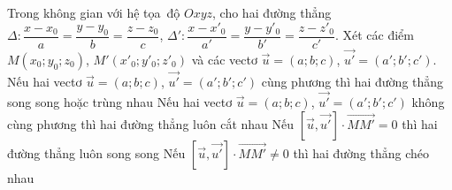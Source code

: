 \begin{ex}%
	Trong không  gian với hệ tọa~độ $Oxyz$, cho hai đường thẳng $\Delta\colon \dfrac{x-x_0}{a}=\dfrac{y-y_0}{b}=\dfrac{z-z_0}{c}$, $\Delta'\colon \dfrac{x-x'_0}{a'}=\dfrac{y-y'_0}{b'}=\dfrac{z-z'_0}{c'}$. Xét các điểm $M\left(x_0; y_0; z_0\right)$, $M'\left(x'_0; y'_0; z'_0\right)$ và các vectơ $\overrightarrow{u}=(a; b; c)$, $\overrightarrow{u'}=\left(a'; b'; c'\right)$.
	 \choiceTF
		{\True Nếu  hai vectơ $\overrightarrow{u}=(a; b; c)$, $\overrightarrow{u'}=\left(a'; b'; c'\right)$ cùng phương thì hai đường thẳng song song hoặc trùng nhau}
		{Nếu hai vectơ $\overrightarrow{u}=(a; b; c)$, $\overrightarrow{u'}=\left(a'; b'; c'\right)$ không cùng phương thì hai đường thẳng luôn  cắt nhau}
		{Nếu $\left[\overrightarrow{u}, \overrightarrow{u'}\right] \cdot \overrightarrow{MM'}=0$  thì hai đường thẳng luôn song song}
		{\True Nếu $\left[\overrightarrow{u}, \overrightarrow{u'}\right] \cdot \overrightarrow{MM'} \neq 0$ thì hai đường  thẳng chéo nhau}
\end{ex}

